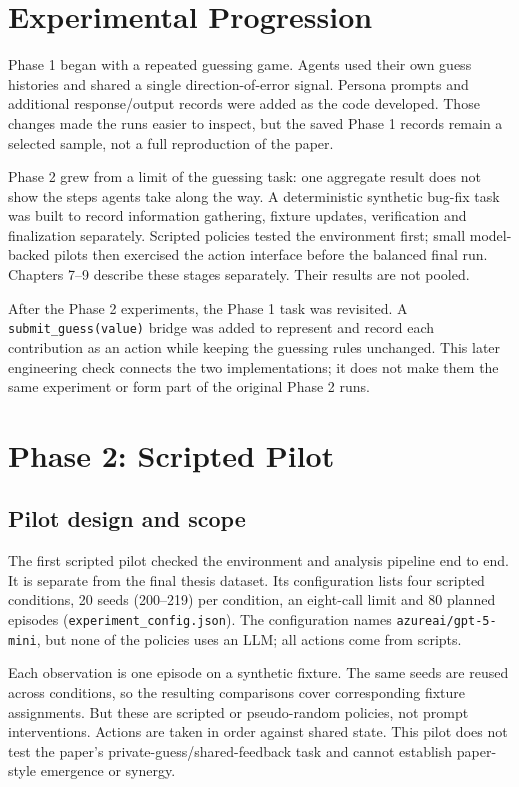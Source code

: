 \documentclass[12pt,a4paper,oneside]{report}
\begin{document}
\chapter{Experimental Progression}
\label{chapter-06}
\thispagestyle{plain}
Phase 1 began with a repeated guessing game. Agents used their own guess histories and shared a single direction-of-error signal. Persona prompts and additional response/output records were added as the code developed. Those changes made the runs easier to inspect, but the saved Phase 1 records remain a selected sample, not a full reproduction of the paper.

Phase 2 grew from a limit of the guessing task: one aggregate result does not show the steps agents take along the way. A deterministic synthetic bug-fix task was built to record information gathering, fixture updates, verification and finalization separately. Scripted policies tested the environment first; small model-backed pilots then exercised the action interface before the balanced final run. Chapters 7–9 describe these stages separately. Their results are not pooled.

After the Phase 2 experiments, the Phase 1 task was revisited. A \texttt{submit\allowbreak\_guess(value)} bridge was added to represent and record each contribution as an action while keeping the guessing rules unchanged. This later engineering check connects the two implementations; it does not make them the same experiment or form part of the original Phase 2 runs.

\chapter{Phase 2: Scripted Pilot}
\label{chapter-07}
\thispagestyle{plain}
\section{Pilot design and scope}
The first scripted pilot checked the environment and analysis pipeline end to end. It is separate from the final thesis dataset. Its configuration lists four scripted conditions, 20 seeds (200–219) per condition, an eight-call limit and 80 planned episodes (\texttt{experiment\allowbreak\_config.json}). The configuration names \texttt{azureai/gpt-5-mini}, but none of the policies uses an LLM; all actions come from scripts.

Each observation is one episode on a synthetic fixture. The same seeds are reused across conditions, so the resulting comparisons cover corresponding fixture assignments. But these are scripted or pseudo-random policies, not prompt interventions. Actions are taken in order against shared state. This pilot does not test the paper’s private-guess/shared-feedback task and cannot establish paper-style emergence or synergy.
\end{document}
